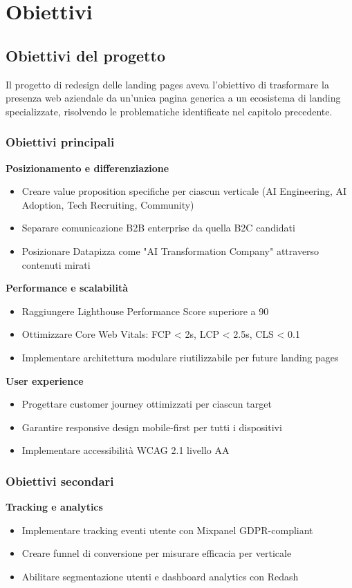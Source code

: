 \chapter{Obiettivi}

\section{Obiettivi del progetto}
Il progetto di redesign delle landing pages aveva l'obiettivo di 
trasformare la presenza web aziendale da un'unica pagina generica a 
un ecosistema di landing specializzate, risolvendo le problematiche 
identificate nel capitolo precedente.

\subsection{Obiettivi principali}
\textbf{Posizionamento e differenziazione}
\begin{itemize}
  \item Creare value proposition specifiche per ciascun verticale 
        (AI Engineering, AI Adoption, Tech Recruiting, Community)
  \item Separare comunicazione B2B enterprise da quella B2C candidati
  \item Posizionare Datapizza come "AI Transformation Company" 
        attraverso contenuti mirati
\end{itemize}

\textbf{Performance e scalabilità}
\begin{itemize}
  \item Raggiungere Lighthouse Performance Score superiore a 90
  \item Ottimizzare Core Web Vitals: FCP < 2s, LCP < 2.5s, CLS < 0.1
  \item Implementare architettura modulare riutilizzabile per future 
        landing pages
\end{itemize}

\textbf{User experience}
\begin{itemize}
  \item Progettare customer journey ottimizzati per ciascun target
  \item Garantire responsive design mobile-first per tutti i dispositivi
  \item Implementare accessibilità WCAG 2.1 livello AA
\end{itemize}

\subsection{Obiettivi secondari}
\textbf{Tracking e analytics}
\begin{itemize}
  \item Implementare tracking eventi utente con Mixpanel 
        GDPR-compliant
  \item Creare funnel di conversione per misurare efficacia per 
        verticale
  \item Abilitare segmentazione utenti e dashboard analytics con Redash
\end{itemize}

